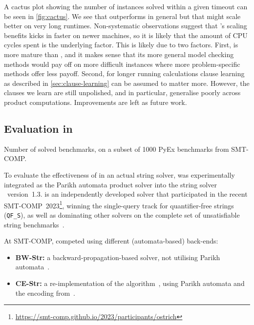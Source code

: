 A cactus plot showing the number of instances solved within a given timeout can
be seen in \cref{fig:cactus}. We see that \Calculus{} outperforms \Nuxmv{} in
general but that \Nuxmv{} might scale better on very long runtimes.
Non-systematic observations suggest that \Nuxmv{}'s scaling benefits kicks in
faster on newer machines, so it is likely that the amount of CPU cycles spent is
the underlying factor. This is likely due to two factors. First, \Nuxmv{} is
more mature than \Calculus{}, and it makes sense that its more general model
checking methods would pay off on more difficult instances where more
problem-specific methods offer less payoff. Second, for longer running
calculations clause learning as described in \cref{sec:clause-learning} can be
assumed to matter more. However, the clauses we learn are still unpolished, and
in particular, generalise poorly across product computations. Improvements are
left as future work.

\subsection{Evaluation in \Ostrich{}}\label{}%

\begin{table}
  \begin{center}
  
  \end{center}
  \caption{Number of solved benchmarks, on a subset of 1000
    PyEx benchmarks from SMT-COMP.}\label{tab:solve-status-smt-comp}
\end{table}

To evaluate the effectiveness of \Calculus{} in an actual string solver,
\Catra{} was experimentally integrated as the Parikh automata product solver
into the string solver \Ostrich{}~version~1.3. \Ostrich{} is an independently
developed solver that participated in the recent SMT-COMP~2023\footnote{\url{https://smt-comp.github.io/2023/participants/ostrich}},
 winning the single-query track
for quantifier-free strings (\texttt{QF\_S}), as well as dominating
other solvers on the complete set of
 unsatisfiable string benchmarks~\cite{smt-comp-23}.

 At SMT-COMP, \Ostrich{} competed using different
 (automata-based) back-ends:
\begin{itemize}
\item \textbf{BW-Str:} a backward-propagation-based solver, not utilising
  Parikh automata~\cite{ostrich}.
\item \textbf{CE-Str:} a re-implementation of the \OstrichPlus{}
  algorithm~\cite{ostrich-plus}, using Parikh automata and the
  encoding from~\cite{generate-parikh-image}.
\end{itemize}

